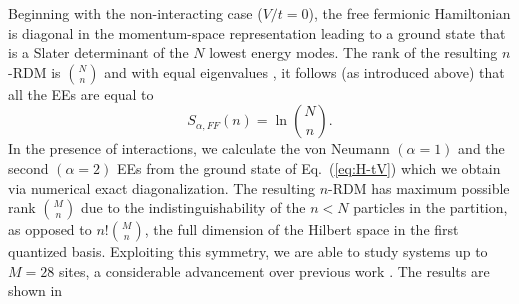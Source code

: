 Beginning with the non-interacting case ($V/t=0$), the free fermionic 
Hamiltonian is diagonal in the momentum-space representation leading to a
ground state that is a Slater determinant of the $N$ lowest energy modes. The
rank of the resulting $n$-RDM is $\binom{N}{n}$ and with equal eigenvalues
\cite{Zozulya:2008kb}, it follows (as introduced above) that all the \ren EEs are equal to   
%
\begin{equation}
S_{\alpha,FF}(n) =\ln{\binom{N}{n}}.
\label{S_FF_tV} 
\end{equation}
%
In the presence of interactions, we calculate the von Neumann $(\alpha=1)$ and
the second $(\alpha=2)$ \ren EEs from the ground state of Eq.~(\ref{eq:H-tV})
which we obtain via numerical exact diagonalization. The resulting $n$-RDM has
maximum possible rank $\binom{M}{n}$ due to the indistinguishability of the
$n<N$ particles in the partition, as opposed to $n!\binom{M}{n}$, the full
dimension of the Hilbert space in the first quantized basis.  Exploiting this
symmetry, we are able to study systems up to
$M=28$ sites, a considerable advancement over previous work
\cite{Haque:2009df}.  The results are shown in 
%
